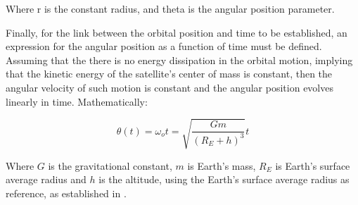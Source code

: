 \indent
Where r is the constant radius, and theta is the angular position parameter.

\indent 
Finally, for the link between the orbital position and time to be established, an expression for the angular position as a function of time must be defined. Assuming that the there is no energy dissipation in the orbital motion, implying that the kinetic energy of the satellite's center of mass is constant, then the angular velocity of such motion is constant and the angular position evolves linearly in time. Mathematically:

\begin{equation}
	\theta (t) = \omega_o t = \sqrt{\frac{Gm}{(R_E + h)^3}}t
\end{equation} 

\indent
Where $G$ is the gravitational constant, $m$ is Earth's mass, $R_E$ is Earth's surface average radius and $h$ is the altitude, using the Earth's surface average radius as reference, as established in \cite{Edemar}. 

